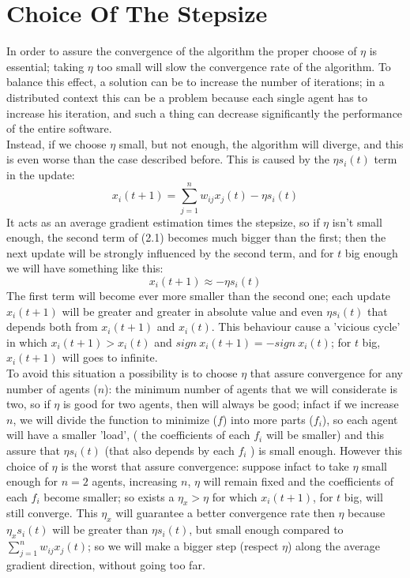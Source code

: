 \documentclass[a4paper,11pt,oneside]{book}
\begin{document}
{{\section{Choice Of The Stepsize}
In order to assure the convergence of the algorithm the proper choose of $\eta$ is essential; taking $\eta$ too small will slow the convergence rate of the algorithm. To balance this effect, a solution can be to increase the number of iterations; in a distributed context this can be a problem because each single agent has to increase his iteration, and such a thing can decrease significantly the performance of the entire software.
\\ Instead, if we choose $\eta$ small, but not enough, the algorithm will diverge, and this is  even worse than the case described before. This is caused by the $\eta s_i(t)$ term in the update:
\begin{equation}
x_i(t+1) = \sum\limits_{j=1}^{n} w_{ij} x_j(t)-\eta s_i(t)
\end{equation} 
It acts as an average gradient estimation  times the stepsize, so if $\eta$ isn't small enough, the second term of (2.1)  becomes much bigger than the first; then the next update will be strongly influenced by the second term, and for $t$ big enough we will have something like this:
\begin{equation}
x_i(t+1) \approx -\eta s_i(t)
\end{equation} 
The first term will become  ever more smaller than the second one; each update $x_i(t+1)$ will be greater and greater in absolute value and even $\eta s_i(t)$ that depends both from $x_i(t+1)$ and $x_i(t)$. This behaviour cause a 'vicious cycle' in which  $x_i(t+1)>x_i(t)$ and $sign ~x_i(t+1)= - sign~ x_i(t)$; for $t$ big, $x_i(t+1)$ will goes to infinite.
\\ To avoid this situation a possibility is to choose $\eta$ that assure convergence for any number of agents ($n$): the minimum number of agents that we will considerate is two, so if $\eta$ is good for two agents, then will always be good; infact if we increase $n$, we will divide the function to minimize ($f$) into more parts ($f_{i}$), so each agent will have a smaller 'load', ( the coefficients of  each $f_{i}$ will be smaller) and this assure that $\eta s_i(t)$ (that also depends by each $f_{i}$ ) is small enough. However this choice of $\eta$ is the worst that assure convergence: suppose infact to take $\eta$ small enough for $n=2$ agents, increasing $n$, $\eta$ will remain fixed and the coefficients of each $f_{i}$ become smaller; so exists a $\eta_{x}>\eta$ for which $x_i(t+1)$, for $t$ big, will still converge. This $\eta_{x}$ will guarantee a better convergence rate then $\eta$ because $\eta_{x} s_i(t)$ will be greater than $\eta s_i(t)$, but small enough compared to $ \sum\limits_{j=1}^{n} w_{ij} x_j(t)$; so we will make a bigger step (respect $\eta$) along the average gradient direction, without going too far.
}}
\end{document}
